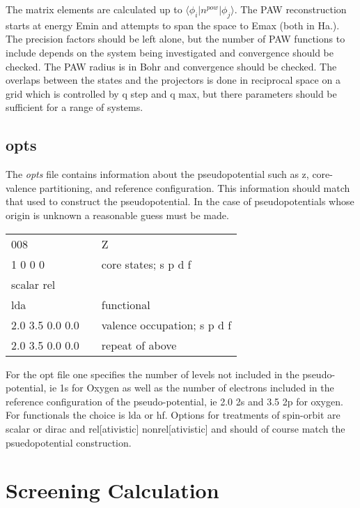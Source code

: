 \documentclass[12pt]{article}
\begin{document}
The matrix elements are calculated up to $\langle \phi_i \vert n^{pow} \vert \phi_j \rangle$. The PAW reconstruction starts at energy Emin and attempts to span the space to Emax (both in Ha.). The precision factors should be left alone, but the number of PAW functions to include depends on the system being investigated and convergence should be checked. The PAW radius is in Bohr and convergence should be checked. The overlaps between the states and the projectors is done in reciprocal space on a grid which is controlled by q step and q max, but there parameters should be sufficient for a range of systems.


\subsection{opts}
The \emph{opts} file contains information about the pseudopotential such as z, core-valence partitioning, and reference configuration. This information should match that used to construct the pseudopotential. In the case of pseudopotentials 
whose origin is unknown a reasonable guess must be made.

\begin{center}
\begin{tabular}{| l | c l |}
\hline
008				& &  Z\\
1 0 0 0			& & core states; s p d f \\
scalar rel			& & \\
lda				& & functional \\
2.0 3.5 0.0 0.0		& & valence occupation; s p d f \\
2.0 3.5 0.0 0.0		& & repeat of above \\
\hline
\end{tabular}
\end{center}

For the opt file one specifies the number of levels not included in the pseudo-potential, ie 1s for Oxygen as well as the number of electrons included in the reference configuration of the pseudo-potential, ie 2.0 2s and 3.5 2p for oxygen. For functionals the choice is lda or hf. Options for treatments of spin-orbit are 
scalar or dirac and rel[ativistic] nonrel[ativistic] and should of course match the psuedopotential 
construction. 

\section{Screening Calculation}
\end{document}
